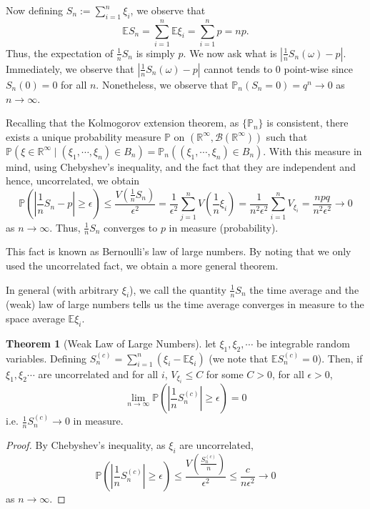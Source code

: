 \documentclass[]{article}
\theoremstyle{definition}
\newtheorem{theorem}{Theorem}
\theoremstyle{definition}
\begin{document}
Now defining \(S_n := \sum_{i = 1}^n \xi_i\), we observe that 
\[\mathbb{E}S_n = \sum_{i = 1}^n \mathbb{E}\xi_i = \sum_{i = 1}^n p = np.\]
Thus, the expectation of \(\frac{1}{n} S_n\) is simply \(p\). We now ask what is 
\(|\frac{1}{n}S_n(\omega) - p|\). Immediately, we observe that \(|\frac{1}{n}S_n(\omega) - p|\) 
cannot tends to 0 point-wise since \(S_n(0) = 0\) for all \(n\). Nonetheless, 
we observe that \(\mathbb{P}_n(S_n = 0) = q^n \to 0\) as \(n \to \infty\). 

Recalling that the Kolmogorov extension theorem, as \(\{\mathbb{P}_n\}\) is consistent, 
there exists a unique probability measure \(\mathbb{P}\) on \((\mathbb{R}^\infty, \mathcal{B}(\mathbb{R}^\infty))\) 
such that \(\mathbb{P}(\xi \in \mathbb{R}^\infty \mid (\xi_1, \cdots, \xi_n) \in B_n) = 
\mathbb{P}_n((\xi_1, \cdots, \xi_n) \in B_n)\). With this measure in mind, using 
Chebyshev's inequality, and the fact that they are independent and hence, uncorrelated,
we obtain 
\[\mathbb{P}\left(\left|\frac{1}{n}S_n - p\right| \ge \epsilon\right) \le \frac{V(\frac{1}{n}S_n)}{\epsilon^2}
  = \frac{1}{\epsilon^2} \sum_{j = 1}^n V\left(\frac{1}{n} \xi_i\right) = \frac{1}{n^2 \epsilon^2}\sum_{i = 1}^n V_{\xi_i}
  = \frac{npq}{n^2 \epsilon^2} \to 0\]
as \(n \to \infty\). Thus, \(\frac{1}{n}S_n\) converges to \(p\) in measure (probability).

This fact is known as Bernoulli's law of large numbers. By noting that we only used 
the uncorrelated fact, we obtain a more general theorem.

In general (with arbitrary \(\xi_i\)), we call the quantity \(\frac{1}{n} S_n\) the 
time average and the (weak) law of large numbers tells us the time average converges 
in measure to the space average \(\mathbb{E}\xi_i\). 

\begin{theorem}[Weak Law of Large Numbers]
  let \(\xi_1, \xi_2, \cdots\) be integrable random variables. Defining 
  \(S_n^{(c)} = \sum_{i = 1}^n (\xi_i - \mathbb{E}\xi_i)\) (we note that 
  \(\mathbb{E}S_n^{(c)} = 0\)). Then, if \(\xi_1, \xi_2 \cdots\) are uncorrelated 
  and for all \(i\), \(V_{\xi_i} \le C\) for some \(C > 0\), for all \(\epsilon > 0\),
  \[\lim_{n \to \infty} \mathbb{P}\left(\left|\frac{1}{n} S_n^{(c)}\right| \ge \epsilon\right) = 0\]
  i.e. \(\frac{1}{n}S^{(c)}_n \to 0\) in measure.
\end{theorem}
\begin{proof}
  By Chebyshev's inequality, as \(\xi_i\) are uncorrelated,
  \[\mathbb{P}\left(\left|\frac{1}{n}S_n^{(c)}\right| \ge \epsilon\right) \le 
  \frac{V(\frac{S_n^{(c)}}{n})}{\epsilon^2} \le \frac{c}{n\epsilon^2} \to 0\]
  as \(n \to \infty\).
\end{proof}
\end{document}
